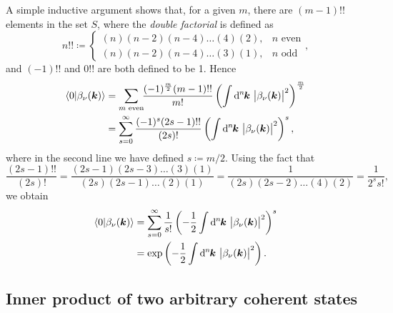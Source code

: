 \documentclass[pra,nofootinbib,floats,aps,twocolumn,tightenlines,superscriptaddress]{revtex4-1}
\renewcommand*\d[2][]{%
	\mathrm{d}%
	\ifx\relax#1\relax\else
	\rule{-0.02em}{1.5ex}^{#1}\rule{0.08em}{0ex}\!
	\fi
	#2\,
}
\newcommand{\bra}[1]{\langle {#1} |}
\newcommand{\bnu}{\beta_\nu(\bm k)}
\begin{document}
A simple inductive argument shows that, for a given $m$, there are $(m-1)!!$ elements in the set $S$, where the \textit{double factorial} is defined as
\begin{equation}
    n!!\coloneqq
    \begin{cases}
    (n)(n-2)(n-4)\ldots(4)(2),& n \text{ even}
    \\
    (n)(n-2)(n-4)\ldots(3)(1),& n \text{ odd}
    \end{cases},
\end{equation}
and $(-1)!!$ and $0!!$ are both defined to be 1. Hence
\begin{align}
    \bra{0}\bnu\rangle
    &=
    \sum_{m \text{ even}}\!\!
    \frac{(-1)^\frac{m}{2}(m-1)!!}{m!}
    \left(
    \int\d[n]{\bm k}
    \left|
    \bnu
    \right|^2
    \right)^\frac{m}{2}
    \notag\\
    &=
    \sum_{s=0}^\infty
    \frac{(-1)^s(2s-1)!!}{(2s)!}
    \left(
    \int\d[n]{\bm k}
    \left|
    \bnu
    \right|^2
    \right)^s,
\end{align}
where in the second line we have defined $s\coloneqq m/2$. Using the fact that
\begin{equation}
    \frac{(2s-1)!!}{(2s)!}
    =
    \frac{(2s-1)(2s-3)\ldots(3)(1)}{(2s)(2s-1)\dots(2)(1)}
    =
    \frac{1}{(2s)(2s-2)\ldots(4)(2)}
    =
    \frac{1}{2^s s!},
\end{equation}
we obtain
\begin{align}
\label{eq:inner_prod1}
    \bra{0}\bnu\rangle
    &=
    \sum_{s=0}^\infty
    \frac{1}{s!}
    \left(-\frac{1}{2}
    \int\d[n]{\bm k}
    \left|
    \bnu
    \right|^2
    \right)^s
    \notag\\
    &=
    \exp
    \left(
    -\frac{1}{2}
    \int\d[n]{\bm k}
    \left|
    \bnu
    \right|^2
    \right).
\end{align}



\subsection{Inner product of two arbitrary coherent states}
\end{document}
